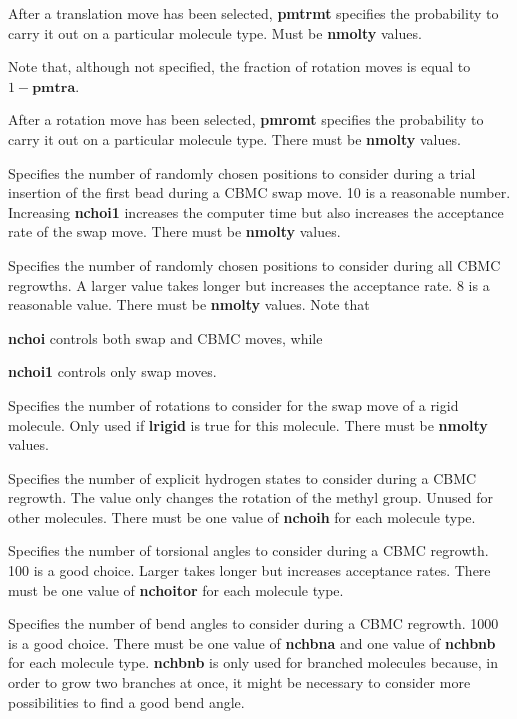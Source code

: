 \documentclass[12pt,letterpaper]{article}
\begin{document}
{{ After a translation move has been selected,
{\textbf{pmtrmt}} specifies the probability to carry it out on a particular molecule
type.  Must be {\textbf{nmolty}} values.

\noindent Note that, although not specified, the fraction of rotation moves is equal to 
$1 - {\textbf{pmtra}}$.

 After a rotation move has been selected,
{\textbf{pmromt}} specifies the probability to carry it out on a particular molecule
type.  There must be {\textbf{nmolty}} values.

 Specifies the number of randomly chosen
positions to consider during a trial insertion of the first bead during a CBMC
swap move.  10 is a reasonable number.  
Increasing {\textbf{nchoi1}} increases the computer time but also increases
the acceptance rate of the swap move.
There must be {\textbf{nmolty}} values.

 Specifies the number of randomly chosen positions
to consider during all CBMC regrowths.  A larger value takes longer
but increases the acceptance rate.  8 is a reasonable value.  
There must be {\textbf{nmolty}} values.
Note that {\textbf{nchoi} controls both swap and CBMC moves, while 
{\textbf{nchoi1} controls only swap moves.

 Specifies the number of rotations to consider
for the swap move of a rigid molecule.  
Only used if {\textbf{lrigid}} is true for this molecule.  
There must be {\textbf{nmolty}} values.

 Specifies the number of explicit hydrogen states
to consider during a CBMC regrowth.  The value only changes the rotation of the 
methyl group.  Unused for other molecules. There must be one value
of {\textbf {nchoih}} for each molecule type.

 Specifies the number of torsional angles to
consider during a CBMC regrowth.  100 is a good choice.  Larger takes
longer but increases acceptance rates.  There must be one value of
{\textbf {nchoitor}} for each molecule type.

 Specifies the number of bend angles to
consider during a CBMC regrowth.  1000 is a good choice.  
There must be one value of {\textbf {nchbna}} and one value of {\textbf{nchbnb}} 
for each molecule type.
{\textbf {nchbnb}} is only used for branched molecules because, in order to grow two branches 
at once, it might be necessary to consider more possibilities to find a good bend angle.

}}}}
\end{document}
